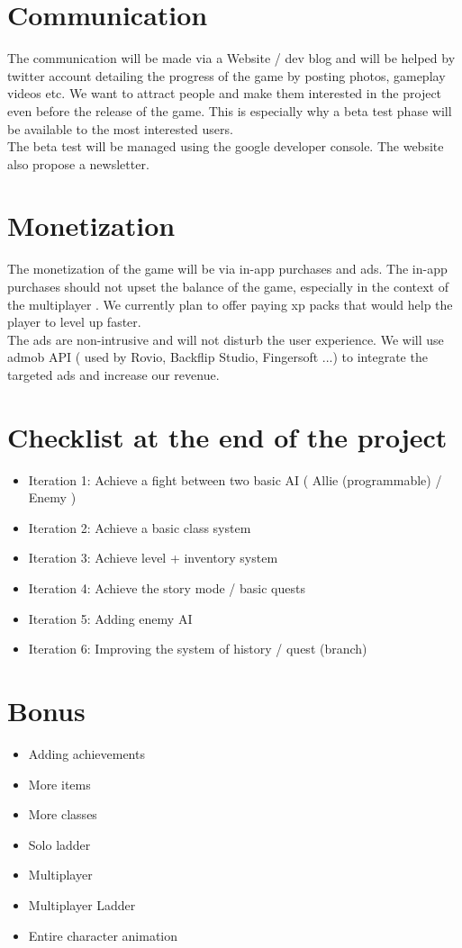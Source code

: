 \documentclass[16pt, oneside]{report}
\begin{document}
\chapter{Communication}
The communication will be made via a Website / dev blog and will be helped by twitter account detailing the progress of the game by posting photos, gameplay videos etc. We want to attract people and make them interested in the project even before the release of the game. This is especially why a beta test phase will be available to the most interested users. \\
 The beta test will be managed using the google developer console. The website also propose a newsletter.

\chapter{Monetization}
The monetization of the game will be via in-app purchases and ads.
The in-app purchases should not upset the balance of the game, especially in the context of the multiplayer . We currently plan to offer paying xp packs that would help the player to level up faster. \\
The ads are non-intrusive and will not disturb the user experience. We will use admob  API ( used by Rovio, Backflip Studio, Fingersoft ...) to integrate the targeted ads and increase our revenue.

\chapter{Checklist at the end of the project}
\begin{itemize}
\item Iteration 1: Achieve a fight between two basic AI ( Allie (programmable) / Enemy )
\item Iteration 2: Achieve a basic class system
\item Iteration 3: Achieve level + inventory system
\item Iteration 4: Achieve the story mode / basic quests
\item Iteration 5: Adding enemy AI
\item Iteration 6: Improving the system of history / quest (branch)\\
\end{itemize}

\chapter{Bonus}
\begin{itemize}
	\item	Adding achievements
	\item	More items
	\item	More classes
	\item	Solo ladder
	\item Multiplayer
	\item	 Multiplayer Ladder
	\item	Entire character animation
\end{itemize}
\end{document}
